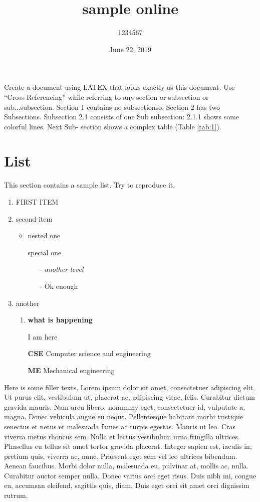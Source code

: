 \documentclass{article}
\title{
sample online\\
}
\author{1234567}
\date{June 22, 2019 }
\begin{document}
\maketitle

Create a document using LATEX that looks exactly as this document. Use “Cross-Referencing” while referring to any section or subsection or sub...subsection. Section 1 contains no subsectionso. Section 2 has two Subsections. Subsection 2.1 consists of one Sub subsection: 2.1.1 shows some colorful lines. Next Sub-
section shows a complex table (Table \ref{tab:1}).

\section{List}
This section contains a sample list. Try to reproduce it.
\begin{enumerate}
    \item FIRST ITEM
    \item second item
        \begin{itemize}
            \item nested one
            \item [] special one
            \begin{itemize}
                \item [-] \textit{another level}
                \item [-] Ok enough
            \end{itemize}
        \end{itemize}
    \item another
        \begin{enumerate}
            \item \textbf{what is happening}
            \item[] I am here 
            \item[] \textbf{CSE} Computer science and engineering 
            \item[] \textbf{ME} Mechanical engineering 
        \end{enumerate}
\end{enumerate}
\vspace{3mm}
Here is some filler texts. Lorem ipsum dolor sit amet, consectetuer adipiscing elit. Ut purus elit, vestibulum ut, placerat ac, adipiscing vitae, felis. Curabitur dictum gravida mauris. Nam arcu libero, nonummy eget, consectetuer id, vulputate a, magna. Donec vehicula augue eu neque. Pellentesque habitant morbi tristique senectus et netus et malesuada fames ac turpis egestas. Mauris ut leo. Cras viverra metus rhoncus sem. Nulla et lectus vestibulum urna fringilla ultrices. Phasellus eu tellus sit amet tortor gravida placerat. Integer sapien
est, iaculis in, pretium quis, viverra ac, nunc. Praesent eget sem vel leo ultrices 
bibendum. Aenean faucibus. Morbi dolor nulla, malesuada eu, pulvinar at, mollis ac, nulla. Curabitur auctor semper nulla. Donec varius orci eget risus. Duis nibh mi, congue eu, accumsan eleifend, sagittis quis, diam. Duis eget orci
sit amet orci dignissim rutrum.
\end{document}
